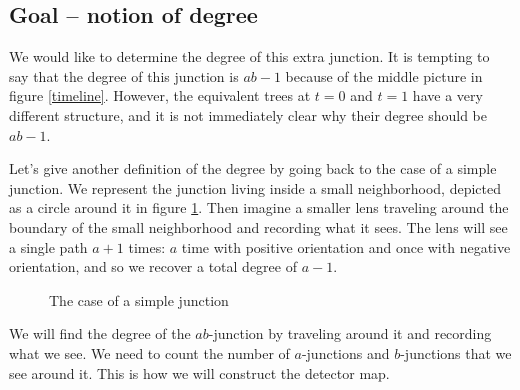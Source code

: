\documentclass[12pt]{amsart}
\theoremstyle{plain}
\theoremstyle{definition}
\theoremstyle{remark}
\begin{document}
\subsection{Goal -- notion of degree}
We would like to determine the degree of this extra junction. 
It is tempting to say that the degree of this junction is $ab-1$ because of the middle picture in figure \ref{timeline}.
However, the equivalent trees at $t=0$ and $t=1$ have a very different structure, 
and it is not immediately clear why their degree should be $ab-1$.

Let's give another definition of the degree by going back to the case of a simple junction.
We represent the junction living inside a small neighborhood, depicted as a circle around it in figure \ref{simplej}.
Then imagine a smaller lens traveling around the boundary of the small neighborhood and recording what it sees.
The lens will see a single path $a+1$ times:
$a$ time with positive orientation and once with negative orientation, and so we recover a total degree of $a-1$.
\begin{figure}
\begin{center}
\end{center}
\caption{The case of a simple junction}
\label{simplej}
\end{figure}

We will find the degree of the $ab$-junction by traveling around it and recording what we see.
We need to count the number of $a$-junctions and $b$-junctions that we see around it.
This is how we will construct the detector map.
\end{document}
